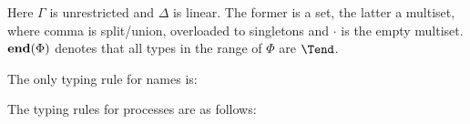 Here $\Gamma$ is unrestricted and $\Delta$ is linear. The former is a set, the latter a multiset, where comma is split/union, overloaded to singletons and $\cdot$ is the empty multiset.  $\tend \Phi$ denotes that all types in the range of $\Phi$ are $\Tend$.
The only typing rule for names is:
\begin{mathpar}
\end{mathpar}
The typing rules for processes are as follows:

